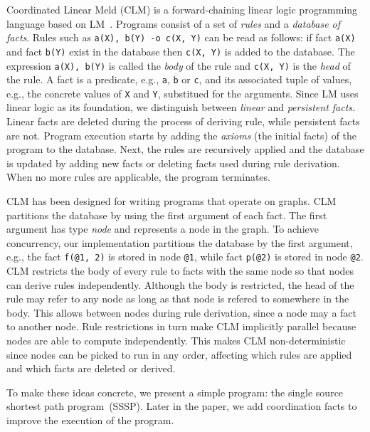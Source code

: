 Coordinated Linear Meld (CLM) is a forward-chaining linear logic programming
language based on LM~\cite{cruz-iclp14}.
Programs consist of a set of \emph{rules} and a \emph{database of facts}.
Rules such as \texttt{a(X), b(Y) -o c(X, Y)} can be read as follows: if fact \texttt{a(X)}
and fact \texttt{b(Y)} exist in the database then \texttt{c(X, Y)} is added to
the database. The expression \texttt{a(X), b(Y)} is called the \emph{body} of
the rule and \texttt{c(X, Y)} is the \emph{head} of the rule.
A fact is a predicate, e.g., \texttt{a}, \texttt{b} or \texttt{c}, and its
associated tuple of values, e.g., the concrete values of \texttt{X} and
\texttt{Y}, substitued for the
arguments. Since LM uses linear logic as its foundation, we distinguish between
\emph{linear} and \emph{persistent facts}. Linear facts are deleted during the
process of deriving rule, while persistent facts are not.
Program execution starts by adding the \emph{axioms} (the initial facts) of the program to the database.
Next, the rules are recursively applied and the database is updated by adding
new facts or deleting facts used during rule derivation.
When no more rules are applicable, the program terminates.

CLM has been designed for writing programs that operate on graphs. CLM partitions
the database by using the first argument of each fact. The first argument has
type \emph{node} and represents a node in the graph. To achieve concurrency,
our implementation partitions the database by the first argument, e.g.,
the fact \texttt{f(@1, 2)} is stored in node \texttt{@1}, while
fact \texttt{p(@2)} is stored in node \texttt{@2}. CLM restricts the body of
every rule to facts with the same node so that nodes can derive rules
independently. Although the body is restricted, the head of the rule may refer
to any node as long as that node is refered to somewhere in the body. This allows
 between nodes during rule derivation, since a node may
 a fact to another node.  Rule restrictions in turn make CLM
implicitly parallel because nodes are able to compute independently. This makes
CLM non-deterministic since nodes can be picked to run in any order, affecting
which rules are applied and which facts are deleted or derived.

To make these ideas concrete, we present a simple
program: the single source shortest path program~(SSSP). Later in the paper, we
add coordination facts to improve the execution of the program.

